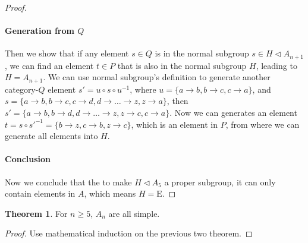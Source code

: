 \documentclass[]{article}
\theoremstyle{definition}\newtheorem{theorem}{Theorem}
\begin{document}
\begin{proof}
\paragraph{Generation from $Q$}Then we show that if any element $s\in Q$ is in the normal subgroup $s \in H\triangleleft A_{n+1}$, we can find an element $t \in P$ that is also in the normal subgroup $H$, leading to $H = A_{n+1}$. We can use normal subgroup's definition to generate another category-$Q$ element $s' = u\circ s \circ u^{-1}$, where $u = \{a\rightarrow b,b\rightarrow c, c\rightarrow a\}$, and $s = \{a\rightarrow b,b\rightarrow c,c\rightarrow d,d\rightarrow \dots\rightarrow z,z\rightarrow a\}$, then $s' = \{a\rightarrow b,b\rightarrow d,d\rightarrow \dots\rightarrow z,z\rightarrow c,c\rightarrow a\}$. Now we can generates an element $t = s\circ s'^{-1} = \{b\rightarrow z,c\rightarrow b,z\rightarrow c\}$, which is an element in $P$, from where we can generate all elements into $H$.

\paragraph{Conclusion}Now we conclude that the to make $H \triangleleft A_5$ a proper subgroup, it can only contain elements in $A$, which means $H = \mathrm{E}$.

\end{proof}

\begin{theorem}
	\label{an-simple}
	For $n \ge 5$, $A_n$ are all simple.
\end{theorem}
\begin{proof}
	Use mathematical induction on the previous two theorem.
\end{proof}
\end{document}
